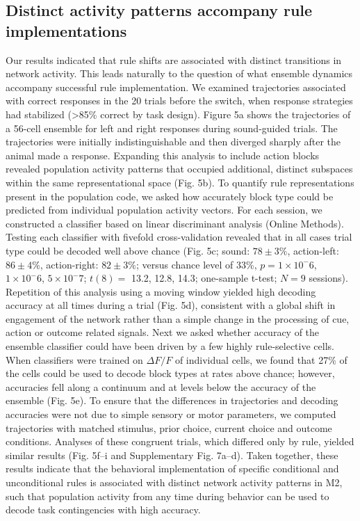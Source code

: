 \subsection{Distinct activity patterns accompany rule implementations}
Our results indicated that rule shifts are associated with distinct transitions in network activity. This leads naturally to the question of what ensemble dynamics accompany successful rule implementation. We examined trajectories associated with correct responses in the 20 trials before the switch, when response strategies had stabilized (>85\% correct by task design). Figure 5a shows the trajectories of a 56-cell ensemble for left and right responses during sound-guided trials. The trajectories were initially indistinguishable and then diverged sharply after the animal made a response. Expanding this analysis to include action blocks revealed population activity patterns that occupied additional, distinct subspaces within the same representational space (Fig. 5b). To quantify rule representations present in the population code, we asked how accurately block type could be predicted from individual population activity vectors. For each session, we constructed a classifier based on linear discriminant analysis (Online Methods). Testing each classifier with fivefold cross-validation revealed that in all cases trial type could be decoded well above chance (Fig. 5c; sound: $78 \pm 3\%$, action-left: $86 \pm 4\%$, action-right: $82 \pm 3\%$; versus chance level of 33\%, $p = 1 \times 10^-6$, $1 \times 10^-6$, $5 \times 10^-7$; $t(8) = $ 13.2, 12.8, 14.3; one-sample t-test; $N = 9$ sessions). Repetition of this analysis using a moving window yielded high decoding accuracy at all times during a trial (Fig. 5d), consistent with a global shift in engagement of the network rather than a simple change in the processing of cue, action or outcome related signals. Next we asked whether accuracy of the ensemble classifier could have been driven by a few highly rule-selective cells. When classifiers were trained on $\Delta F/F$ of individual cells, we found that 27\% of the cells could be used to decode block types at rates above chance; however, accuracies fell along a continuum and at levels below the accuracy of the ensemble (Fig. 5e). To ensure that the differences in trajectories and decoding accuracies were not due to simple sensory or motor parameters, we computed trajectories with matched stimulus, prior choice, current choice and outcome conditions. Analyses of these congruent trials, which differed only by rule, yielded similar results (Fig. 5f–i and Supplementary Fig. 7a–d). Taken together, these results indicate that the behavioral implementation of specific conditional and unconditional rules is associated with distinct network activity patterns in M2, such that population activity from any time during behavior can be used to decode task contingencies with high accuracy.

